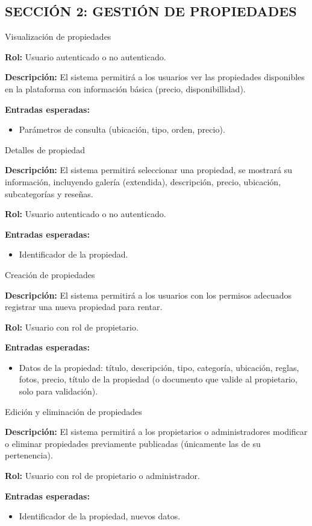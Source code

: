 \subsection*{\uppercase{Sección 2: Gestión de Propiedades}}
\begin{requisito}{Visualización de propiedades}
	\item \textbf{Rol:} Usuario autenticado o no autenticado.
	\item \textbf{Descripción:} El sistema permitirá a los usuarios  ver las propiedades disponibles en la plataforma con información básica (precio, disponibillidad).
	\item \textbf{Entradas esperadas:}
	\begin{itemize}
		\item Parámetros de consulta (ubicación, tipo, orden, precio).
	\end{itemize}
\end{requisito}
\begin{requisito}{Detalles de propiedad}
	\item \textbf{Descripción:} El sistema permitirá seleccionar una propiedad, se mostrará su información, incluyendo galería (extendida), descripción, precio, ubicación, subcategorías y reseñas. 
	\item \textbf{Rol:} Usuario autenticado o no autenticado.
	\item \textbf{Entradas esperadas:}
	\begin{itemize}
		\item Identificador de la propiedad.
	\end{itemize}
	
\end{requisito}
\begin{requisito}{Creación de propiedades}
	\item \textbf{Descripción:} El sistema permitirá a los usuarios con los permisos adecuados registrar una nueva propiedad para rentar.
	\item \textbf{Rol:} Usuario con rol de propietario.
	\item \textbf{Entradas esperadas:}
	\begin{itemize}
		\item Datos de la propiedad: título, descripción, tipo, categoría, ubicación, reglas, fotos, precio, título de la propiedad (o documento que valide al propietario, solo para validación).
	\end{itemize}
\end{requisito}
\begin{requisito}{Edición y eliminación de propiedades}
	\item \textbf{Descripción:} El sistema permitirá a los propietarios o administradores modificar o eliminar propiedades previamente publicadas (únicamente las de su pertenencia).
	\item \textbf{Rol:} Usuario con rol de propietario o administrador.
	\item \textbf{Entradas esperadas:}
	\begin{itemize}
		\item Identificador de la propiedad, nuevos datos.
	\end{itemize}
\end{requisito}
